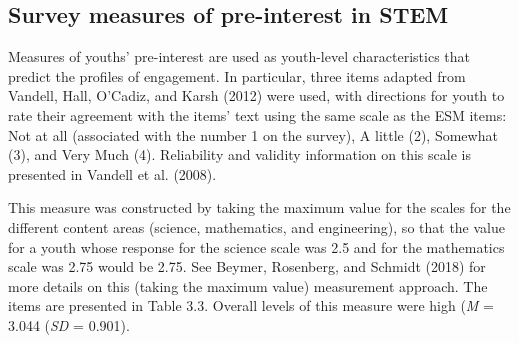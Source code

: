 \documentclass[]{msu-thesis}
\theoremstyle{definition}
\theoremstyle{definition}
\theoremstyle{definition}
\theoremstyle{remark}
\begin{document}
\begin{landscape}\begin{table}

\caption{\label{tab:unnamed-chunk-5}Coding Frame for Work With Data}
\centering
{}
\end{table}
\end{landscape}

\subsection{Survey measures of pre-interest in
STEM}\label{survey-measures-of-pre-interest-in-stem}

Measures of youths' pre-interest are used as youth-level characteristics
that predict the profiles of engagement. In particular, three items
adapted from Vandell, Hall, O'Cadiz, and Karsh (2012) were used, with
directions for youth to rate their agreement with the items' text using
the same scale as the ESM items: Not at all (associated with the number
1 on the survey), A little (2), Somewhat (3), and Very Much (4).
Reliability and validity information on this scale is presented in
Vandell et al. (2008).

This measure was constructed by taking the maximum value for the scales
for the different content areas (science, mathematics, and engineering),
so that the value for a youth whose response for the science scale was
2.5 and for the mathematics scale was 2.75 would be 2.75. See Beymer,
Rosenberg, and Schmidt (2018) for more details on this (taking the
maximum value) measurement approach. The items are presented in Table
3.3. Overall levels of this measure were high (\emph{M} = 3.044
(\emph{SD} = 0.901).
\end{document}

